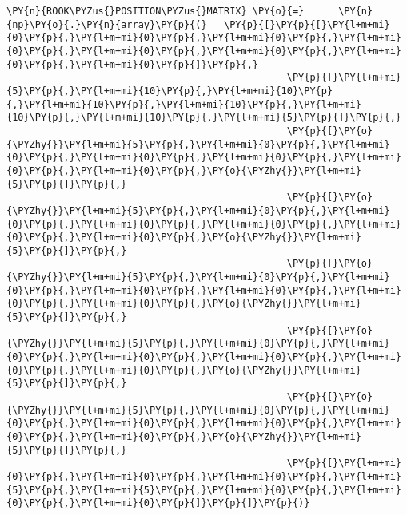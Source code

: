 \begin{Verbatim}[commandchars=\\\{\}]
         \PY{n}{ROOK\PYZus{}POSITION\PYZus{}MATRIX} \PY{o}{=}      \PY{n}{np}\PY{o}{.}\PY{n}{array}\PY{p}{(}   \PY{p}{[}\PY{p}{[}\PY{l+m+mi}{0}\PY{p}{,}\PY{l+m+mi}{0}\PY{p}{,}\PY{l+m+mi}{0}\PY{p}{,}\PY{l+m+mi}{0}\PY{p}{,}\PY{l+m+mi}{0}\PY{p}{,}\PY{l+m+mi}{0}\PY{p}{,}\PY{l+m+mi}{0}\PY{p}{,}\PY{l+m+mi}{0}\PY{p}{]}\PY{p}{,}
                                                 \PY{p}{[}\PY{l+m+mi}{5}\PY{p}{,}\PY{l+m+mi}{10}\PY{p}{,}\PY{l+m+mi}{10}\PY{p}{,}\PY{l+m+mi}{10}\PY{p}{,}\PY{l+m+mi}{10}\PY{p}{,}\PY{l+m+mi}{10}\PY{p}{,}\PY{l+m+mi}{10}\PY{p}{,}\PY{l+m+mi}{5}\PY{p}{]}\PY{p}{,}
                                                 \PY{p}{[}\PY{o}{\PYZhy{}}\PY{l+m+mi}{5}\PY{p}{,}\PY{l+m+mi}{0}\PY{p}{,}\PY{l+m+mi}{0}\PY{p}{,}\PY{l+m+mi}{0}\PY{p}{,}\PY{l+m+mi}{0}\PY{p}{,}\PY{l+m+mi}{0}\PY{p}{,}\PY{l+m+mi}{0}\PY{p}{,}\PY{o}{\PYZhy{}}\PY{l+m+mi}{5}\PY{p}{]}\PY{p}{,}
                                                 \PY{p}{[}\PY{o}{\PYZhy{}}\PY{l+m+mi}{5}\PY{p}{,}\PY{l+m+mi}{0}\PY{p}{,}\PY{l+m+mi}{0}\PY{p}{,}\PY{l+m+mi}{0}\PY{p}{,}\PY{l+m+mi}{0}\PY{p}{,}\PY{l+m+mi}{0}\PY{p}{,}\PY{l+m+mi}{0}\PY{p}{,}\PY{o}{\PYZhy{}}\PY{l+m+mi}{5}\PY{p}{]}\PY{p}{,}
                                                 \PY{p}{[}\PY{o}{\PYZhy{}}\PY{l+m+mi}{5}\PY{p}{,}\PY{l+m+mi}{0}\PY{p}{,}\PY{l+m+mi}{0}\PY{p}{,}\PY{l+m+mi}{0}\PY{p}{,}\PY{l+m+mi}{0}\PY{p}{,}\PY{l+m+mi}{0}\PY{p}{,}\PY{l+m+mi}{0}\PY{p}{,}\PY{o}{\PYZhy{}}\PY{l+m+mi}{5}\PY{p}{]}\PY{p}{,}
                                                 \PY{p}{[}\PY{o}{\PYZhy{}}\PY{l+m+mi}{5}\PY{p}{,}\PY{l+m+mi}{0}\PY{p}{,}\PY{l+m+mi}{0}\PY{p}{,}\PY{l+m+mi}{0}\PY{p}{,}\PY{l+m+mi}{0}\PY{p}{,}\PY{l+m+mi}{0}\PY{p}{,}\PY{l+m+mi}{0}\PY{p}{,}\PY{o}{\PYZhy{}}\PY{l+m+mi}{5}\PY{p}{]}\PY{p}{,}
                                                 \PY{p}{[}\PY{o}{\PYZhy{}}\PY{l+m+mi}{5}\PY{p}{,}\PY{l+m+mi}{0}\PY{p}{,}\PY{l+m+mi}{0}\PY{p}{,}\PY{l+m+mi}{0}\PY{p}{,}\PY{l+m+mi}{0}\PY{p}{,}\PY{l+m+mi}{0}\PY{p}{,}\PY{l+m+mi}{0}\PY{p}{,}\PY{o}{\PYZhy{}}\PY{l+m+mi}{5}\PY{p}{]}\PY{p}{,}
                                                 \PY{p}{[}\PY{l+m+mi}{0}\PY{p}{,}\PY{l+m+mi}{0}\PY{p}{,}\PY{l+m+mi}{0}\PY{p}{,}\PY{l+m+mi}{5}\PY{p}{,}\PY{l+m+mi}{5}\PY{p}{,}\PY{l+m+mi}{0}\PY{p}{,}\PY{l+m+mi}{0}\PY{p}{,}\PY{l+m+mi}{0}\PY{p}{]}\PY{p}{]}\PY{p}{)}
         

\end{Verbatim}
